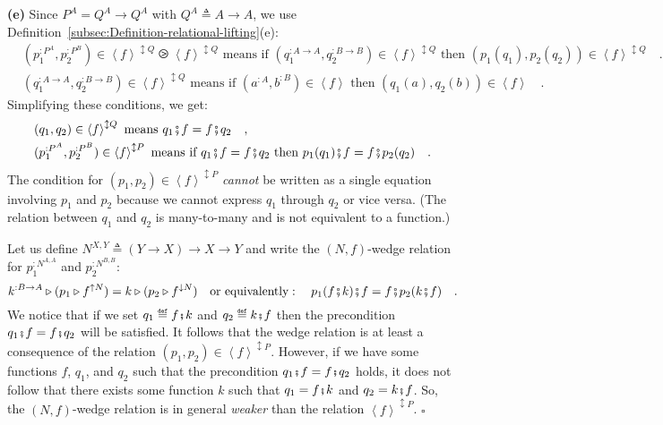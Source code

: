 \textbf{(e)} Since $P^{A}=Q^{A}\rightarrow Q^{A}$ with $Q^{A}\triangleq A\rightarrow A$,
we use Definition~\ref{subsec:Definition-relational-lifting}(e):
\begin{align*}
 & (p_{1}^{:P^{A}},p_{2}^{:P^{B}})\in\left<f\right>^{\updownarrow Q}\ogreaterthan\left<f\right>^{\updownarrow Q}\text{ means if }(q_{1}^{:A\rightarrow A},q_{2}^{:B\rightarrow B})\in\left<f\right>^{\updownarrow Q}\text{ then }(p_{1}(q_{1}),p_{2}(q_{2}))\in\left<f\right>^{\updownarrow Q}\quad.\\
 & (q_{1}^{:A\rightarrow A},q_{2}^{:B\rightarrow B})\in\left<f\right>^{\updownarrow Q}\text{ means if }(a^{:A},b^{:B})\in\left<f\right>\text{ then }(q_{1}(a),q_{2}(b))\in\left<f\right>\quad.
\end{align*}
Simplifying these conditions, we get:
\begin{align*}
 & (q_{1},q_{2})\in\left<f\right>^{\updownarrow Q}\text{ means }q_{1}\bef f=f\bef q_{2}\quad,\\
 & (p_{1}^{:P^{A}},p_{2}^{:P^{B}})\in\left<f\right>^{\updownarrow P}\text{ means if }q_{1}\bef f=f\bef q_{2}\text{ then }p_{1}(q_{1})\bef f=f\bef p_{2}(q_{2})\quad.
\end{align*}
The condition for $(p_{1},p_{2})\in\left<f\right>^{\updownarrow P}$
\emph{cannot} be written as a single equation involving $p_{1}$ and
$p_{2}$ because we cannot express $q_{1}$ through $q_{2}$ or vice
versa. (The relation between $q_{1}$ and $q_{2}$ is many-to-many
and is not equivalent to a function.)

Let us define $N^{X,Y}\triangleq\left(Y\rightarrow X\right)\rightarrow X\rightarrow Y$
and write the $\left(N,f\right)$-wedge relation for $p_{1}^{:N^{A,A}}$
and $p_{2}^{:N^{B,B}}$:
\[
k^{:B\rightarrow A}\triangleright(p_{1}\triangleright f^{\uparrow N})=k\triangleright(p_{2}\triangleright f^{\downarrow N})\quad\text{or equivalently}:\quad p_{1}(f\bef k)\bef f=f\bef p_{2}(k\bef f)\quad.
\]
We notice that if we set $q_{1}\triangleq f\bef k$ and $q_{2}\triangleq k\bef f$
then the precondition $q_{1}\bef f=f\bef q_{2}$ will be satisfied.
It follows that the wedge relation is at least a consequence of the
relation $(p_{1},p_{2})\in\left<f\right>^{\updownarrow P}$. However,
if we have some functions $f$, $q_{1}$, and $q_{2}$ such that the
precondition $q_{1}\bef f=f\bef q_{2}$ holds, it does not follow
that there exists some function $k$ such that $q_{1}=f\bef k$ and
$q_{2}=k\bef f$. So, the $\left(N,f\right)$-wedge relation is in
general\emph{ weaker} than the relation $\left<f\right>^{\updownarrow P}$.
$\square$


